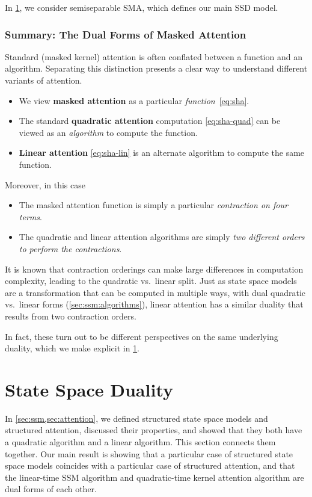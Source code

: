 In \ref{sec:ssd}, we consider semiseparable SMA, which defines our main SSD model.

\subsubsection{Summary: The Dual Forms of Masked Attention}

Standard (masked kernel) attention is often conflated between a function and an algorithm. Separating this distinction presents a clear way to understand different variants of attention.

\begin{itemize}
  \item We view \textbf{masked attention} as a particular \emph{function}~\eqref{eq:sha}.
  \item The standard \textbf{quadratic attention} computation \eqref{eq:sha-quad} can be viewed as an \emph{algorithm} to compute the function.
  \item \textbf{Linear attention} \eqref{eq:sha-lin} is an alternate algorithm to compute the same function.
\end{itemize}

Moreover, in this case

\begin{itemize}
  \item The masked attention function is simply a particular \emph{contraction on four terms}.
  \item The quadratic and linear attention algorithms are simply \emph{two different orders to perform the contractions}.
\end{itemize}

It is known that contraction orderings can make large differences in computation complexity, leading to the quadratic vs.\ linear split. Just as state space models are a transformation that can be computed in multiple ways, with dual quadratic vs.\ linear forms (\ref{sec:ssm:algorithms}),
linear attention has a similar duality that results from two contraction orders.

In fact, these turn out to be different perspectives on the same underlying duality, which we make explicit in \ref{sec:ssd}.

\section{State Space Duality}
\label{sec:ssd}

In \ref{sec:ssm,sec:attention}, we defined structured state space models and structured attention, discussed their properties, and showed that they both have a quadratic algorithm and a linear algorithm. This section connects them together. Our main result is showing that a particular case of structured state space models coincides with a particular case of structured attention, and that the linear-time SSM algorithm and quadratic-time kernel attention algorithm are dual forms of each other.

